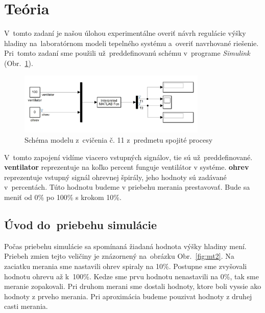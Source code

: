 \documentclass{article}
\begin{document}
\section{Teória}
\label{sec:teoria}

V~tomto zadaní je našou úlohou experimentálne overiť návrh regulácie výšky hladiny na~laboratórnom
modeli tepelného systému a~overiť navrhované riešenie. Pri~tomto zadaní sme použili už~preddefinovanú schému
v~programe \textit{Simulink} (Obr.~\ref{fig:schema}).

\begin{figure}[!htbp]
	\begin{center}
		\includegraphics[width=0.8\textwidth]{./include/schema.png}
	\end{center}
	\caption{Schéma modelu z~cvičenia č. 11 z~predmetu spojité procesy}
	\label{fig:schema}
\end{figure}

V~tomto zapojení vidíme viacero vstupných signálov, tie sú už~preddefinované. \textbf{ventilator} reprezentuje
na koľko percent funguje ventilátor v systéme. \textbf{ohrev} reprezentuje vstupný signál ohrevnej špirály,
jeho hodnoty sú zadávané v~percentách. Túto hodnotu budeme v priebehu merania prestavovať. Bude sa meniť
od 0\% po 100\% s krokom 10\%.

\clearpage

\subsection{Úvod do~priebehu simulácie}
\label{subsec:priebehSimulacie}

Počas priebehu simulácie sa spomínaná žiadaná hodnota výšky hladiny mení. Priebeh zmien tejto veličiny je znázornený na~obrázku Obr.~\ref{fig:mt2}.
Na zaciatku merania sme nastavili ohrev spiraly na 10\%. Postupne sme zvyšovali hodnotu ohrevu až k~100\%.
Kedze sme prvu hodnotu nenastavili na 0\%, tak sme meranie zopakovali. Pri druhom merani sme dostali hodnoty,
ktore boli vyssie ako hodnoty z prveho merania. Pri aproximácia budeme pouzivat hodnoty z druhej casti merania.
\end{document}
